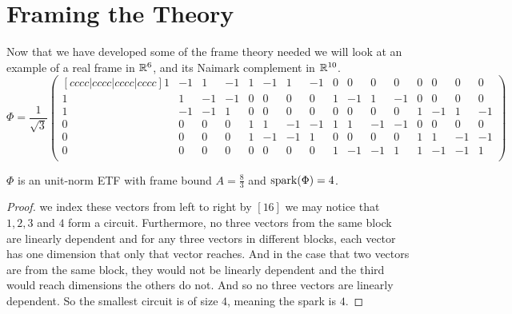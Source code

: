 \section{Framing the Theory}
\label{sec:example}
Now that we have developed some of the frame theory needed we will look at an example of a real frame in $\mathbb{R}^6$, and its Naimark complement in $\mathbb{R}^{10}$. 
$$\Phi=\frac{1}{\sqrt{3}}\begin{pmatrix}[cccc|cccc|cccc|cccc]
1&-1&1&-1&1&-1&1&-1&0&0&0&0&0&0&0&0\\
1&1&-1&-1&0&0&0&0&1&-1&1&-1&0&0&0&0\\
1&-1&-1&1&0&0&0&0&0&0&0&0&1&-1&1&-1\\
0&0&0&0&1&1&-1&-1&1&1&-1&-1&0&0&0&0\\
0&0&0&0&1&-1&-1&1&0&0&0&0&1&1&-1&-1\\
0&0&0&0&0&0&0&0&1&-1&-1&1&1&-1&-1&1\\
\end{pmatrix}$$

\begin{example}
$\Phi$ is an unit-norm ETF with frame bound $A=\frac{8}{3}$ and $\operatorname{\mathrm{spark}}(\Phi)=4$.
\end{example}

\begin{proof}
\iftoggle{full}{First to show that $\Phi$ is tight frame we will compute the frame operator. Notice that the inner product of any two rows will mostly be the product of zeros, but it may be the case that two columns will agree and two will disagree in sign, meaning the inner product of distinct rows is $0$. Notice also that the norm squared of every row is $8\cdot \left(\frac{1}{\sqrt 3}\right)^2=\frac{8}{3}$. So $\Phi$ is a tight frame by proposition \ref{prop:bigboi_prop}.

Now we need to show that this is an equal angular tight frame. We can do this by noting that every two distinct columns will have a non-zero element in $1$ or $3$ entries and in the case of $1$ entry the sign will disagree and in the case of $3$, $1$ entry will agree in sign and the other $2$ with disagree so we find that $\ip{\phi_j,\phi_k}=-\frac{1}{3}$ for all $j\neq k$ and $\ip{\phi_j,\phi_j}=1$ for all $j$. And so $\Phi$ is a finite unit norm equiangular tight frame.

Finally, notice if}{If} we index these vectors from left to right by $[16]$ we may notice that $1,2,3$ and $4$ form a circuit. Furthermore, no three vectors from the same block are linearly dependent and for any three vectors in different blocks, each vector has one dimension that only that vector reaches. And in the case that two vectors are from the same block, they would not be linearly dependent and the third would reach dimensions the others do not. And so no three vectors are linearly dependent. So the smallest circuit is of size $4$, meaning the spark is $4$.
\end{proof}

